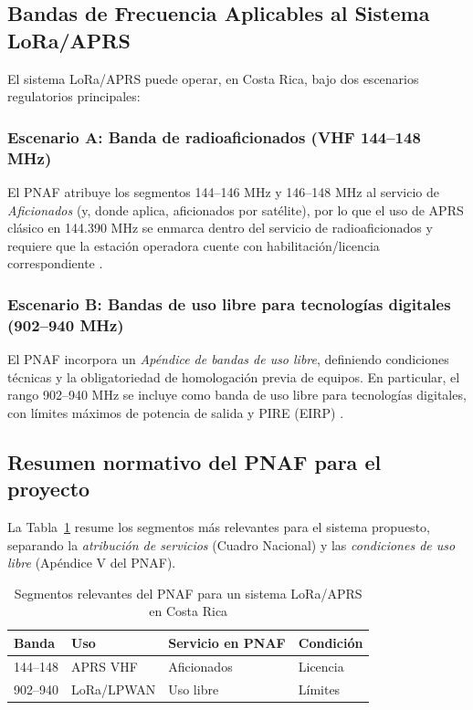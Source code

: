\documentclass[conference]{IEEEtran}
\begin{document}
\subsection{Bandas de Frecuencia Aplicables al Sistema LoRa/APRS}
El sistema LoRa/APRS puede operar, en Costa Rica, bajo dos escenarios regulatorios principales:

\subsubsection{Escenario A: Banda de radioaficionados (VHF 144--148 MHz)}
El PNAF atribuye los segmentos 144--146 MHz y 146--148 MHz al servicio de \textit{Aficionados} (y, donde aplica, aficionados por satélite), por lo que el uso de APRS clásico en 144.390 MHz se enmarca dentro del servicio de radioaficionados y requiere que la estación operadora cuente con habilitación/licencia correspondiente \cite{pnaf_2023_micitt,sutel_radioaficionados}.

\subsubsection{Escenario B: Bandas de uso libre para tecnologías digitales (902--940 MHz)}
El PNAF incorpora un \emph{Apéndice de bandas de uso libre}, definiendo condiciones técnicas y la obligatoriedad de homologación previa de equipos. En particular, el rango 902--940 MHz se incluye como banda de uso libre para tecnologías digitales, con límites máximos de potencia de salida y PIRE (EIRP) \cite{pnaf_2023_micitt}.

\subsection{Resumen normativo del PNAF para el proyecto}
La Tabla~\ref{tab:pnab_lora_aprs} resume los segmentos más relevantes para el sistema propuesto, separando la \emph{atribución de servicios} (Cuadro Nacional) y las \emph{condiciones de uso libre} (Apéndice V del PNAF).

\begin{table}[t]
\caption{Segmentos relevantes del PNAF para un sistema LoRa/APRS en Costa Rica}
\label{tab:pnab_lora_aprs}
\centering
\scriptsize
\setlength{\tabcolsep}{3pt}
\renewcommand{\arraystretch}{1.15}
\begin{tabularx}{\columnwidth}{@{}l l X l@{}}
\toprule
\textbf{Banda} & \textbf{Uso} & \textbf{Servicio en PNAF} & \textbf{Condición} \\
\midrule
144--148 & APRS VHF & Aficionados & Licencia \\
902--940 & LoRa/LPWAN & Uso libre  & Límites \\
\bottomrule
\end{tabularx}
\end{table}
\end{document}
